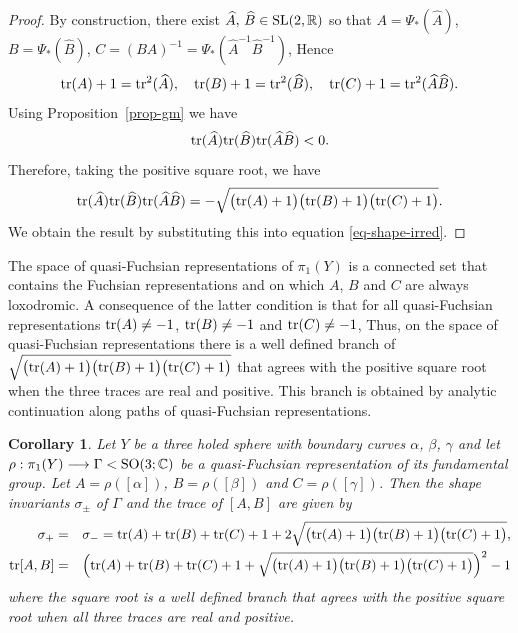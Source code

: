 \documentclass[11pt]{amsart}
\newtheorem{corollary}[theorem]{Corollary}
\numberwithin{equation}{section}
\begin{document}
\begin{proof}
By construction, there exist $\widehat{A},\,\widehat{B}\in{\rm SL}(2,{\mathbb R})$ so that 
$A=\Psi_*(\widehat{A})$, $B=\Psi_*(\widehat{B})$, $C=(BA)^{-1}=\Psi_*(\widehat{A}^{-1}\widehat{B}^{-1})$, 
Hence
$$
{\rm tr}(A)+1={\rm tr}^2(\widehat{A}),\quad {\rm tr}(B)+1={\rm tr}^2(\widehat{B}),\quad 
{\rm tr}(C)+1={\rm tr}^2(\widehat{A}\widehat{B}).
$$
Using Proposition~\ref{prop-gm} we have
$$
{\rm tr}(\widehat{A}){\rm tr}(\widehat{B}){\rm tr}(\widehat{A}\widehat{B})<0.
$$
Therefore, taking the positive square root, we have
$$
{\rm tr}(\widehat{A}){\rm tr}(\widehat{B}){\rm tr}(\widehat{A}\widehat{B})
=-\sqrt{\bigl({\rm tr}(A)+1\bigr)\bigl({\rm tr}(B)+1\bigr)\bigl({\rm tr}(C)+1\bigr)}.
$$
We obtain the result by substituting this into equation \eqref{eq-shape-irred}.
\end{proof}

\medskip

The space of quasi-Fuchsian representations of $\pi_1(Y)$ is a connected set that contains the Fuchsian representations
and on which $A$, $B$ and $C$ are always loxodromic. A consequence of the latter condition is that for all
quasi-Fuchsian representations ${\rm tr}(A)\neq -1$, ${\rm tr}(B)\neq -1$ and ${\rm tr}(C)\neq -1$,  Thus, on the
space of quasi-Fuchsian representations there
is a well defined branch of $\sqrt{\bigl({\rm tr}(A)+1\bigr)\bigl({\rm tr}(B)+1\bigr)\bigl({\rm tr}(C)+1\bigr)}$ that
agrees with the positive square root when the three traces are real and positive. This branch is obtained
by analytic continuation along paths of quasi-Fuchsian representations.

\begin{corollary}\label{cor-shape-quasiF}
Let $Y$ be a three holed sphere with boundary curves $\alpha$, $\beta$, $\gamma$ and let 
$\rho:\pi_1(Y)\longrightarrow \Gamma<{\rm SO}(3;{\mathbb C})$ be a quasi-Fuchsian representation of its fundamental group. 
Let $A=\rho([\alpha])$, $B=\rho([\beta])$ and $C=\rho([\gamma])$. Then the shape invariants $\sigma_\pm$ of $\Gamma$ 
and the trace of $[A,B]$ are given by
\begin{eqnarray*}
\sigma_+ & = & \sigma_-={\rm tr}(A)+{\rm tr}(B)+{\rm tr}(C)+1
+2\sqrt{\bigl({\rm tr}(A)+1\bigr)\bigl({\rm tr}(B)+1\bigr)\bigl({\rm tr}(C)+1\bigr)}, \\
{\rm tr}[A,B] & = & \Bigl({\rm tr}(A)+{\rm tr}(B)+{\rm tr}(C)+1+
\sqrt{\bigl({\rm tr}(A)+1\bigr)\bigl({\rm tr}(B)+1\bigr)\bigl({\rm tr}(C)+1\bigr)}\Bigr)^2-1
\end{eqnarray*}
where the square root is a well defined branch that agrees with the positive square root when all three traces are
real and positive.
\end{corollary}
\end{document}
